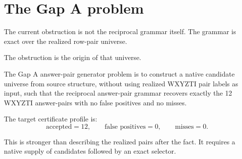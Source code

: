 \section{The Gap A problem}

The current obstruction is not the reciprocal grammar itself. The grammar is exact over the realized row-pair universe.

The obstruction is the origin of that universe.

\begin{definition}
The Gap A answer-pair generator problem is to construct a native candidate universe from source structure, without using realized WXYZTI pair labels as input, such that the reciprocal answer-pair grammar recovers exactly the 12 WXYZTI answer-pairs with no false positives and no misses.
\end{definition}

The target certificate profile is:
\[
\text{accepted}=12,\qquad
\text{false positives}=0,\qquad
\text{misses}=0.
\]

This is stronger than describing the realized pairs after the fact. It requires a native supply of candidates followed by an exact selector.
